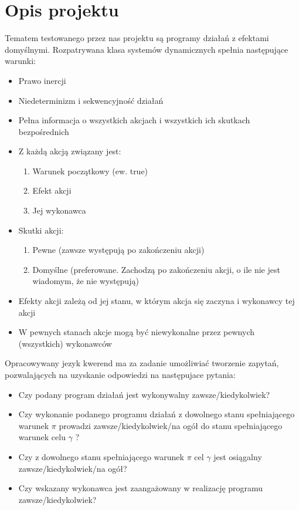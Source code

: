 \documentclass{article}
\begin{document}
\newpage

\section{Opis projektu}
Tematem testowanego przez nas projektu są programy działań z efektami domyślnymi. Rozpatrywana klasa systemów dynamicznych spełnia następujące warunki:
\begin{itemize}
	\item Prawo inercji
	\item Niedeterminizm i sekwencyjność działań
	\item Pełna informacja o wszystkich akcjach i wszystkich ich skutkach bezpośrednich
	\item Z każdą akcją związany jest:
	\begin{enumerate}
		\item Warunek początkowy (ew. true)
		\item Efekt akcji
		\item Jej wykonawca
	\end{enumerate}
	\item Skutki akcji:
	\begin{enumerate}
		\item Pewne (zawsze występują po zakończeniu akcji)
		\item Domyślne (preferowane. Zachodzą po zakończeniu akcji, o ile nie jest wiadomym, że nie występują)
	\end{enumerate}
	\item Efekty akcji zależą od jej stanu, w którym akcja się zaczyna i wykonawcy tej akcji
	\item W pewnych stanach akcje mogą być niewykonalne przez pewnych (wszystkich) wykonawców
\end{itemize}

Opracowywany jezyk kwerend ma za zadanie umożliwiać tworzenie zapytań,
pozwalających na uzyskanie odpowiedzi na następujace pytania:
\begin{itemize}
	\item Czy podany program działań jest wykonywalny zawsze/kiedykolwiek?
	\item Czy wykonanie podanego programu działań z dowolnego stanu spełniającego warunek $\pi$ prowadzi zawsze/kiedykolwiek/na ogół do stanu spełniającego warunek celu $\gamma$ ?
	\item Czy z dowolnego stanu spełniającego warunek $\pi$ cel $\gamma$ jest osiągalny zawsze/kiedykolwiek/na ogół?
	\item Czy wskazany wykonawca jest zaangażowany w realizację programu zawsze/kiedykolwiek?
\end{itemize}
\newpage
\end{document}
